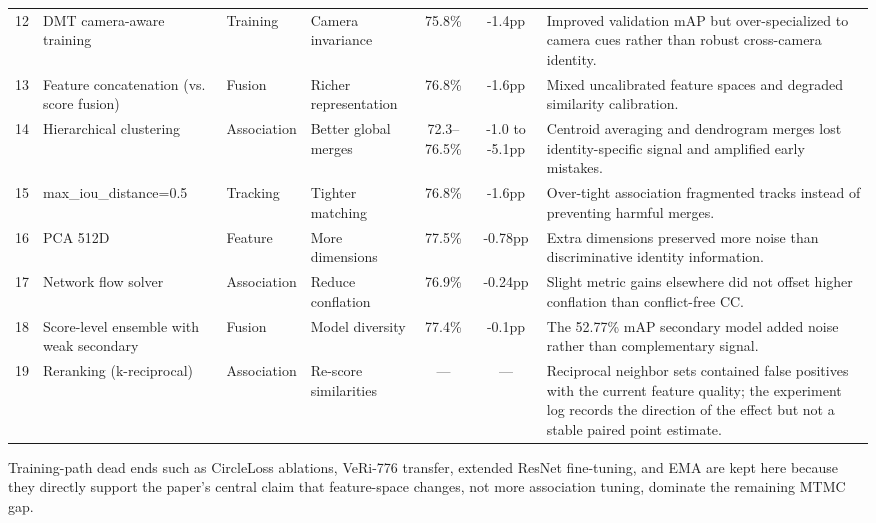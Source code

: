 \begin{tabularx}{\textwidth}{c l l l c c X}
12 & DMT camera-aware training & Training & Camera invariance & 75.8\% & -1.4pp & Improved validation mAP but over-specialized to camera cues rather than robust cross-camera identity. \\
13 & Feature concatenation (vs. score fusion) & Fusion & Richer representation & 76.8\% & -1.6pp & Mixed uncalibrated feature spaces and degraded similarity calibration. \\
14 & Hierarchical clustering & Association & Better global merges & 72.3--76.5\% & -1.0 to -5.1pp & Centroid averaging and dendrogram merges lost identity-specific signal and amplified early mistakes. \\
15 & max\_iou\_distance=0.5 & Tracking & Tighter matching & 76.8\% & -1.6pp & Over-tight association fragmented tracks instead of preventing harmful merges. \\
16 & PCA 512D & Feature & More dimensions & 77.5\% & -0.78pp & Extra dimensions preserved more noise than discriminative identity information. \\
17 & Network flow solver & Association & Reduce conflation & 76.9\% & -0.24pp & Slight metric gains elsewhere did not offset higher conflation than conflict-free CC. \\
18 & Score-level ensemble with weak secondary & Fusion & Model diversity & 77.4\% & -0.1pp & The 52.77\% mAP secondary model added noise rather than complementary signal. \\
19 & Reranking (k-reciprocal) & Association & Re-score similarities & --- & --- & Reciprocal neighbor sets contained false positives with the current feature quality; the experiment log records the direction of the effect but not a stable paired point estimate. \\
\bottomrule
\end{tabularx}

\vspace{0.4em}
\par\noindent\footnotesize Training-path dead ends such as CircleLoss ablations, VeRi-776 transfer, extended ResNet fine-tuning, and EMA are kept here because they directly support the paper's central claim that feature-space changes, not more association tuning, dominate the remaining MTMC gap.
\endgroup
